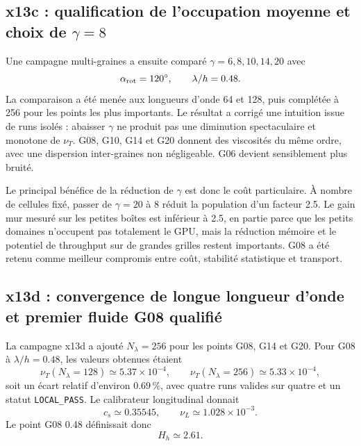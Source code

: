 \documentclass[11pt,a4paper]{article}
\begin{document}
\subsection{x13c : qualification de l'occupation moyenne et choix de \texorpdfstring{$\gamma=8$}{gamma=8}}

Une campagne multi-graines a ensuite comparé $\gamma=6,8,10,14,20$ avec
\begin{equation}
  \alpha_{\rm rot}=120^\circ,
  \qquad
  \lambda/h=0.48.
\end{equation}
La comparaison a été menée aux longueurs d'onde 64 et 128, puis complétée à 256 pour les points les plus importants. Le résultat a corrigé une intuition issue de runs isolés : abaisser $\gamma$ ne produit pas une diminution spectaculaire et monotone de $\nu_T$. G08, G10, G14 et G20 donnent des viscosités du même ordre, avec une dispersion inter-graines non négligeable. G06 devient sensiblement plus bruité.

Le principal bénéfice de la réduction de $\gamma$ est donc le coût particulaire. À nombre de cellules fixé, passer de $\gamma=20$ à 8 réduit la population d'un facteur 2.5. Le gain mur mesuré sur les petites boîtes est inférieur à 2.5, en partie parce que les petits domaines n'occupent pas totalement le GPU, mais la réduction mémoire et le potentiel de throughput sur de grandes grilles restent importants. G08 a été retenu comme meilleur compromis entre coût, stabilité statistique et transport.

\subsection{x13d : convergence de longue longueur d'onde et premier fluide G08 qualifié}

La campagne x13d a ajouté $N_\lambda=256$ pour les points G08, G14 et G20. Pour G08 à $\lambda/h=0.48$, les valeurs obtenues étaient
\begin{equation}
  \nu_T(N_\lambda=128)\simeq5.37\times10^{-4},
  \qquad
  \nu_T(N_\lambda=256)\simeq5.33\times10^{-4},
\end{equation}
soit un écart relatif d'environ $0.69\,\%$, avec quatre runs valides sur quatre et un statut \texttt{LOCAL\_PASS}. Le calibrateur longitudinal donnait
\begin{equation}
  c_s\simeq0.35545,
  \qquad
  \nu_L\simeq1.028\times10^{-3}.
\end{equation}
Le point G08 0.48 définissait donc
\begin{equation}
  H_h\simeq2.61.
\end{equation}
\end{document}
